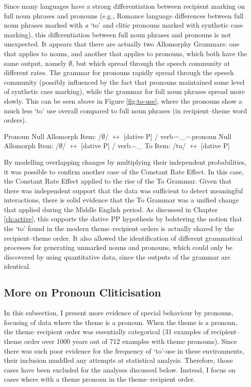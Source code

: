 	Since many languages have a strong differentiation between recipient marking on full noun phrases and pronouns (e.g., Romance language differences between full noun phrases marked with \textit{a} `to' and clitic pronouns marked with synthetic case marking), this differentiation between full noun phrases and pronouns is not unexpected. It appears that there are actually two Allomorphy Grammars: one that applies to nouns, and another that applies to pronouns, which both have the same output, namely $\emptyset$, but which spread through the speech community at different rates. The grammar for pronouns rapidly spread through the speech community (possibly influenced by the fact that pronouns maintained some level of synthetic case marking), while the grammar for full noun phrases spread more slowly. This can be seen above in Figure \ref{fig:to-use}, where the pronouns show a much less `to' use overall compared to full noun phrases (in recipient--theme word orders).

	\begin{exe}
		\ex 
		\begin{xlist}
			\ex Pronoun Null Allomorph Item: /$\emptyset$/ $\leftrightarrow$ [dative P] / verb$\smallfrown$\_$\smallfrown$pronoun
			\ex Null Allomorph Item: /$\emptyset$/ $\leftrightarrow$ [dative P] / verb$\smallfrown$\_
			\ex To Item: /tu/ $\leftrightarrow$ [dative P]
		\end{xlist}
	\end{exe}


	By modelling overlapping changes by multiplying their independent probabilities, it was possible to confirm another case of the Constant Rate Effect. In this case, the Constant Rate Effect applied to the rise of the To Grammar. Given that there was independent support that the data was sufficient to detect meaningful interactions, there is solid evidence that the To Grammar was a unified change that applied during the Middle English period. As discussed in Chapter \ref{ch:active}, this supports the dative PP hypothesis by bolstering the notion that the `to' found in the modern theme--recipient orders is actually shared by the recipient--theme order. It also allowed the identification of different grammatical processes for generating unmarked nouns and pronouns, which could only be discovered by using quantitative data, since the outputs of the grammar are identical.

	\subsection{More on Pronoun Cliticisation}
	In this subsection, I present more evidence of special behaviour by pronouns, focusing of data where the theme is a pronoun. When the theme is a pronoun, the theme--recipient order was essentially categorical (31 examples of recipient--theme order over 1000 years out of 712 examples with theme pronouns). Since there was such poor evidence for the frequency of `to'-use in these environments, their inclusion muddled any attempts at statistical analysis. Therefore, those cases have been excluded for the analyses discussed below. Instead, I focus on cases where with a theme pronoun in the theme--recipient order.

